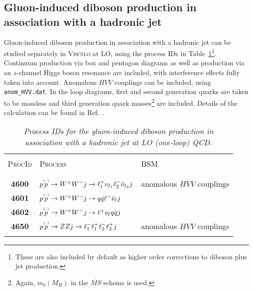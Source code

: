 \documentclass[english,12pt]{article}
\begin{document}
%

\subsection{Gluon-induced diboson production in association with a hadronic jet}

%
Gluon-induced diboson production in association with a hadronic jet can be studied separately in \textsc{Vbfnlo} at
LO, using the process IDs in
Table~\ref{tab:gludibj}\footnote{These are also included by default as higher
order corrections to diboson plus jet production.}.  Continuum production via box and pentagon
diagrams as well as production via an $s$-channel Higgs boson resonance are included, with
interference effects fully taken into account.  Anomalous $HVV$ couplings can be
included, using {\tt anom\_HVV.dat}. In the loop diagrams, first and second generation quarks are taken to
be massless and third generation quark masses\footnote{Again, $m_{b}(M_{H})$ in the $\overline{MS}$ scheme is used.} are included.
Details of the calculation can be found in Ref.~\cite{Campanario:2012bh}.

\begin{table}[t!]
\newcommand{\lstrut}{{$\strut\atop\strut$}}
\begin{center}
\small
\begin{tabular}{c|l|l}
\hline
&\\
\textsc{ProcId} & \textsc{Process} & \textsc{BSM}  \\
&\\
\hline
&\\
\bf 4600 & $p \overset{\mbox{\tiny{(--)}}}{p} \to W^{+}W^{-} j \to \ell_{1}^{+} \nu_{\ell_{1}} \ell_{2}^{-}\bar{\nu}_{\ell_{2}} j $ & \multirow{1}{*}{anomalous $HVV$ couplings}\\
\bf 4601 & $p \overset{\mbox{\tiny{(--)}}}{p} \to W^{+}W^{-} j \to q \bar{q} \ell^{-}\bar{\nu}_{\ell} j $ & \\
\bf 4602 & $p \overset{\mbox{\tiny{(--)}}}{p} \to W^{+}W^{-} j \to \ell^{+} \nu_{\ell} q \bar{q} j $ & \\
\bf 4650 & $p \overset{\mbox{\tiny{(--)}}}{p} \to ZZ j \to \ell_{1}^{-} \ell_{1}^{+}  \ell_{2}^{-} \ell_{2}^{+} j $ & \multirow{1}{*}{anomalous $HVV$ couplings}\\
&\\
\hline
\end{tabular}
\caption {\em  Process IDs for the gluon-induced diboson production in association with a hadronic jet at LO (one-loop) QCD.  }
\vspace{0.2cm}
\label{tab:gludibj}
\end{center}
\end{table}
\end{document}
